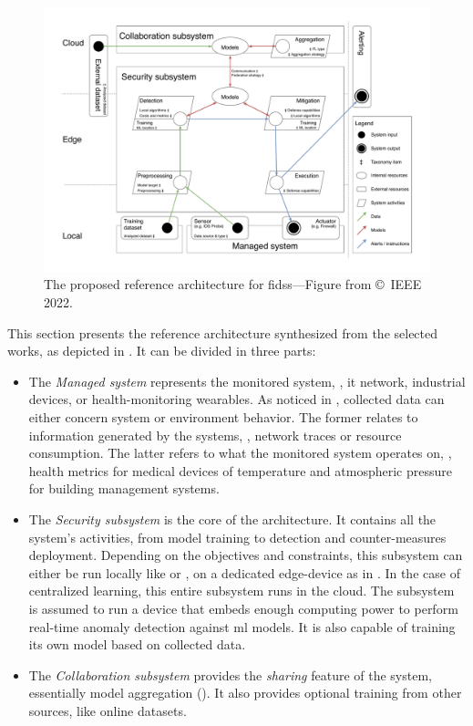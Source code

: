 \begin{figure}
  \centering
  \includegraphics[width=.95\textwidth]{figures/architecture.drawio.pdf}
  \caption{The proposed reference architecture for \glspl{fids}---Figure from \textcite{lavaur_EvolutionFederatedLearningbased_2022} \copyright~IEEE 2022.}
  \label{fig:sota.archi}
\end{figure}

This section presents the reference architecture synthesized from the selected works, as depicted in .
It can be divided in three parts:
\begin{itemize}
  \item The \emph{Managed system} represents the monitored system, \eg, \gls{it} network, industrial devices, or health-monitoring wearables.
  As noticed in , collected data can either concern system or environment behavior.
  The former relates to information generated by the systems, \eg, network traces or resource consumption.
  The latter refers to what the monitored system operates on, \eg, health metrics for medical devices of temperature and atmospheric pressure for building management systems.
  
  \item The \emph{Security subsystem} is the core of the architecture.
  It contains all the system's activities, from model training to detection and counter-measures deployment.
  Depending on the objectives and constraints, this subsystem can either be run locally like \cite{pahl_AllEyesYou_2018} or \cite{hei_trustedfeatureaggregator_2020}, on a dedicated edge-device as in \cite{li_DeepFedFederatedDeep_2020}.
  In the case of centralized learning, this entire subsystem runs in the cloud.
  The subsystem is assumed to run a device that embeds enough computing power to perform real-time anomaly detection against \gls{ml} models.
  It is also capable of training its own model based on collected data.

  \item The \emph{Collaboration subsystem} provides the \emph{sharing} feature of the system, essentially model aggregation ().
  It also provides optional training from other sources, like online datasets.
\end{itemize}

